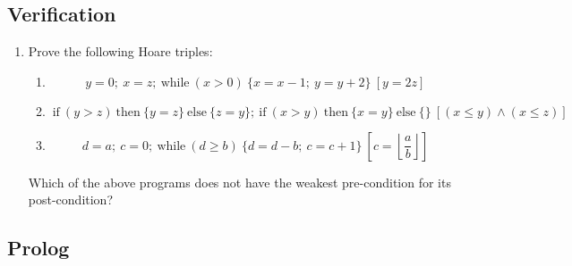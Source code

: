 \documentclass[a4paper, 12pt]{article}
\begin{document}
\subsection*{Verification}

\begin{enumerate}

\item Prove the following Hoare triples:
\begin{enumerate}
    \item
    \begin{equation*}
        [z > 1] \> y = 0; \> x = z; \> \text{while} \> (x > 0) \> \{ x = x - 1; \> y = y + 2 \} \> [y = 2z]
    \end{equation*}
    \item
    \begin{equation*}
        [\top] \> \text{if} \> (y > z) \> \text{then} \> \{ y = z \} \> \text{else} \> \{ z = y \}; \>
        \text{if} \> (x > y) \> \text{then} \> \{ x = y \} \> \text{else} \> \{ \} \> [(x \leq y) \wedge (x \leq z)]
    \end{equation*}
    \item
    \begin{equation*}
        [(a \geq 0) \wedge (b > 0)] \> d = a; \> c = 0; \> \text{while} \> (d \geq b) \> \{ d = d - b; \> c = c + 1 \} \> \left[c = \left \lfloor \frac{a}{b} \right \rfloor  \right]
    \end{equation*}
\end{enumerate}
Which of the above programs does not have the weakest pre-condition for its post-condition?

\end{enumerate}

\newpage

\subsection*{Prolog}
\end{document}
